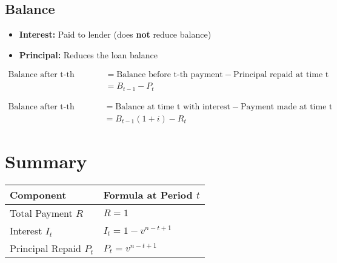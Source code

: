\subsection{Balance}

\begin{itemize}
    \item \textbf{Interest: }Paid to lender (does \textbf{not} reduce balance) 
    \item \textbf{Principal: }Reduces the loan balance \\
\end{itemize}

\begin{comments}
\begin{align*}
\text{Balance after t-th payment} &=\text{Balance before t-th payment} - \text{Principal repaid at time t} \\
&=B_{t-1} - P_t
\end{align*}
\end{comments}

\begin{comments}
\begin{align*}
\text{Balance after t-th payment} &= \text{Balance at time t with interest} - \text{Payment made at time t} \\
&= B_{t-1}(1+i) - R_t
\end{align*}
\end{comments}

\section{Summary}
\begin{definition}
\centering
    \begin{tabular}{|l|l|}
    \hline
    \textbf{Component} & \textbf{Formula at Period \( t \)} \\ \hline
    Total Payment \( R \) & \( R = 1 \) \\ \hline
    Interest \( I_t \) & \( I_t = 1 - v^{n-t+1} \) \\ \hline
    Principal Repaid \( P_t \) & \( P_t = v^{n-t+1} \) \\ \hline
    \hline
    \end{tabular}

\end{definition}